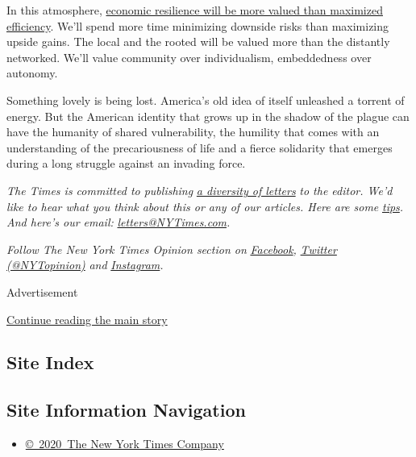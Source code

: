 In this atmosphere,
\href{https://www.nytimes3xbfgragh.onion/2020/04/20/opinion/marco-rubio-coronavirus-economy.html}{economic
resilience will be more valued than maximized efficiency}. We'll spend
more time minimizing downside risks than maximizing upside gains. The
local and the rooted will be valued more than the distantly networked.
We'll value community over individualism, embeddedness over autonomy.

Something lovely is being lost. America's old idea of itself unleashed a
torrent of energy. But the American identity that grows up in the shadow
of the plague can have the humanity of shared vulnerability, the
humility that comes with an understanding of the precariousness of life
and a fierce solidarity that emerges during a long struggle against an
invading force.

\emph{The Times is committed to publishing}
\href{https://www.nytimes3xbfgragh.onion/2019/01/31/opinion/letters/letters-to-editor-new-york-times-women.html}{\emph{a
diversity of letters}} \emph{to the editor. We'd like to hear what you
think about this or any of our articles. Here are some}
\href{https://help.nytimes3xbfgragh.onion/hc/en-us/articles/115014925288-How-to-submit-a-letter-to-the-editor}{\emph{tips}}\emph{.
And here's our email:}
\href{mailto:letters@NYTimes.com}{\emph{letters@NYTimes.com}}\emph{.}

\emph{Follow The New York Times Opinion section on}
\href{https://www.facebookcorewwwi.onion/nytopinion}{\emph{Facebook}}\emph{,}
\href{http://twitter.com/NYTOpinion}{\emph{Twitter (@NYTopinion)}}
\emph{and}
\href{https://www.instagram.com/nytopinion/}{\emph{Instagram}}\emph{.}

Advertisement

\protect\hyperlink{after-bottom}{Continue reading the main story}

\hypertarget{site-index}{%
\subsection{Site Index}\label{site-index}}

\hypertarget{site-information-navigation}{%
\subsection{Site Information
Navigation}\label{site-information-navigation}}

\begin{itemize}
\tightlist
\item
  \href{https://help.nytimes3xbfgragh.onion/hc/en-us/articles/115014792127-Copyright-notice}{©~2020~The
  New York Times Company}
\end{itemize}

